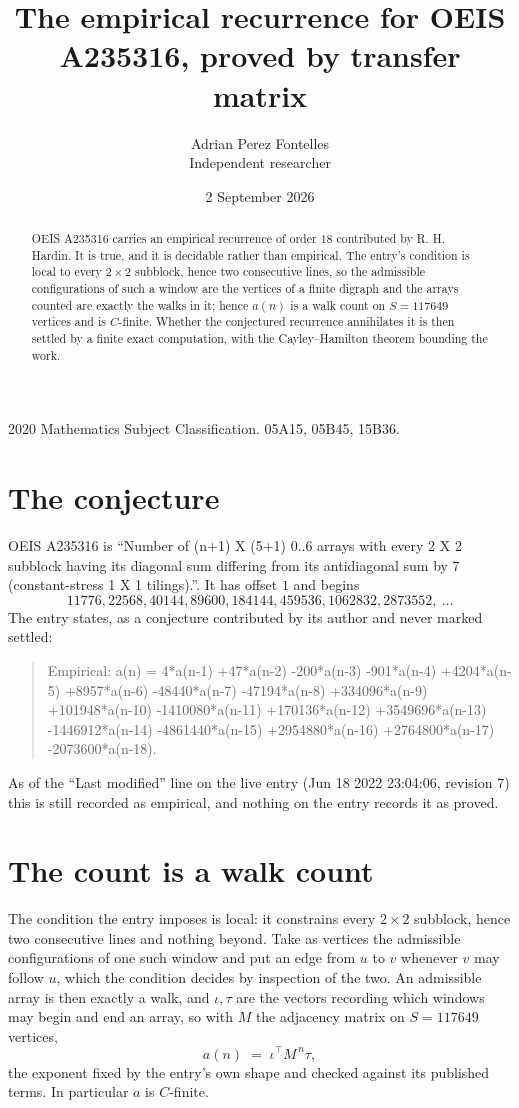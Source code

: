 \documentclass[11pt,a4paper]{article}
\title{The empirical recurrence for OEIS A235316, proved by transfer matrix}
\author{Adrian Perez Fontelles\\ \small Independent researcher}
\date{2 September 2026}
\theoremstyle{plain}
\theoremstyle{definition}
\begin{document}
\maketitle

\begin{abstract}
OEIS A235316 carries an empirical recurrence of order $18$ contributed by R. H. Hardin. It is
true, and it is decidable rather than empirical. The entry's condition is local to every $2\times2$ subblock, hence two consecutive lines, so
the admissible configurations of such a window are the vertices of a finite digraph and the
arrays counted are exactly the walks in it; hence $a(n)$ is a walk count on $S=117649$ vertices
and is $C$-finite. Whether the conjectured recurrence annihilates it is then settled by a
finite exact computation, with the Cayley--Hamilton theorem bounding the work.
\end{abstract}

\noindent\small 2020 Mathematics Subject Classification. 05A15, 05B45, 15B36.\normalsize

\section{The conjecture}

OEIS A235316 is ``Number of (n+1) X (5+1) 0..6 arrays with every 2 X 2 subblock having its diagonal sum differing from its antidiagonal sum by 7 (constant-stress 1 X 1 tilings).''. It has offset $1$ and begins
\[
11776, 22568, 40144, 89600, 184144, 459536, 1062832, 2873552,\ \dots
\]
The entry states, as a conjecture contributed by its author and never marked settled:
\begin{quote}
Empirical: a(n) = 4*a(n-1) +47*a(n-2) -200*a(n-3) -901*a(n-4) +4204*a(n-5) +8957*a(n-6) -48440*a(n-7) -47194*a(n-8) +334096*a(n-9) +101948*a(n-10) -1410080*a(n-11) +170136*a(n-12) +3549696*a(n-13) -1446912*a(n-14) -4861440*a(n-15) +2954880*a(n-16) +2764800*a(n-17) -2073600*a(n-18).
\end{quote}
As of the ``Last modified'' line on the live entry (Jun 18 2022 23:04:06, revision 7) this is still
recorded as empirical, and nothing on the entry records it as proved.

\section{The count is a walk count}

The condition the entry imposes is local: it constrains every $2\times2$ subblock, hence two consecutive lines and nothing beyond. Take as vertices the admissible configurations of one such window and put an edge from $u$ to $v$ whenever $v$ may follow $u$, which the condition decides by inspection of the two.
An admissible array is then exactly a walk, and $\iota,\tau$ are the vectors recording which windows may begin and end an array, so with $M$ the adjacency matrix on $S=117649$ vertices,
\[
a(n)\;=\;\iota^{\!\top}M^{\,n}\tau ,
\]
the exponent fixed by the entry's own shape and checked against its published terms. In
particular $a$ is $C$-finite.
\end{document}

